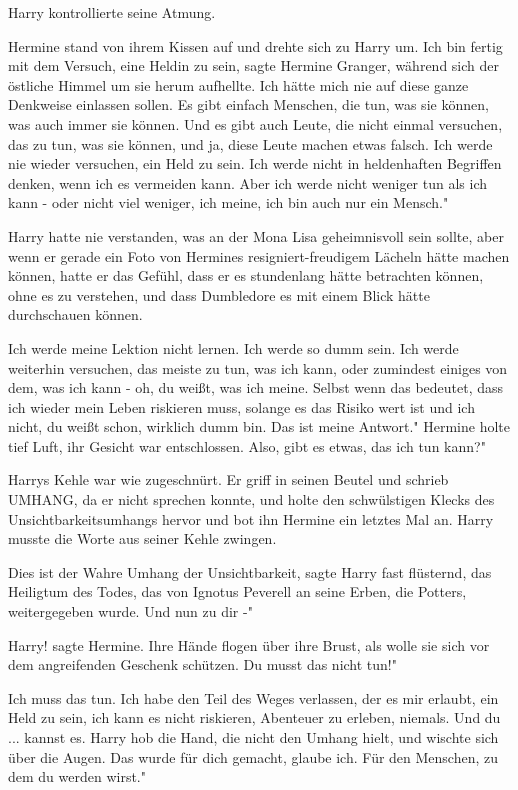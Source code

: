 Harry kontrollierte seine Atmung.

Hermine stand von ihrem Kissen auf und drehte sich zu Harry um. \glqq{}Ich bin
fertig mit dem Versuch, eine Heldin zu sein\grqq{}, sagte Hermine Granger,
während sich der östliche Himmel um sie herum aufhellte. \glqq{}Ich hätte mich
nie auf diese ganze Denkweise einlassen sollen. Es gibt einfach Menschen, die
tun, was sie können, was auch immer sie können. Und es gibt auch Leute, die
nicht einmal versuchen, das zu tun, was sie können, und ja, diese Leute machen
etwas falsch. Ich werde nie wieder versuchen, ein Held zu sein. Ich werde nicht
in heldenhaften Begriffen denken, wenn ich es vermeiden kann. Aber ich werde
nicht weniger tun als ich kann - oder nicht viel weniger, ich meine, ich bin
auch nur ein Mensch."

Harry hatte nie verstanden, was an der Mona Lisa geheimnisvoll sein sollte, aber
wenn er gerade ein Foto von Hermines resigniert-freudigem Lächeln hätte machen
können, hatte er das Gefühl, dass er es stundenlang hätte betrachten können,
ohne es zu verstehen, und dass Dumbledore es mit einem Blick hätte durchschauen
können.

\glqq{}Ich werde meine Lektion nicht lernen. Ich werde so dumm sein. Ich werde
weiterhin versuchen, das meiste zu tun, was ich kann, oder zumindest einiges von
dem, was ich kann - oh, du weißt, was ich meine. Selbst wenn das bedeutet, dass
ich wieder mein Leben riskieren muss, solange es das Risiko wert ist und ich
nicht, du weißt schon, wirklich dumm bin. Das ist meine Antwort." Hermine holte
tief Luft, ihr Gesicht war entschlossen. \glqq{}Also, gibt es etwas, das ich tun
kann?"

Harrys Kehle war wie zugeschnürt. Er griff in seinen Beutel und schrieb UMHANG,
da er nicht sprechen konnte, und holte den schwülstigen Klecks des
Unsichtbarkeitsumhangs hervor und bot ihn Hermine ein letztes Mal an. Harry
musste die Worte aus seiner Kehle zwingen.

\glqq{}Dies ist der Wahre Umhang der Unsichtbarkeit\grqq{}, sagte Harry fast
flüsternd, \glqq{}das Heiligtum des Todes, das von Ignotus Peverell an seine
Erben, die Potters, weitergegeben wurde. Und nun zu dir -"

\glqq{}Harry!\grqq{} sagte Hermine. Ihre Hände flogen über ihre Brust, als wolle
sie sich vor dem angreifenden Geschenk schützen. \glqq{}Du musst das nicht tun!"

\glqq{}Ich muss das tun. Ich habe den Teil des Weges verlassen, der es mir
erlaubt, ein Held zu sein, ich kann es nicht riskieren, Abenteuer zu erleben,
niemals. Und du ... kannst es.\grqq{} Harry hob die Hand, die nicht den Umhang
hielt, und wischte sich über die Augen. \glqq{}Das wurde für dich gemacht, glaube
ich. Für den Menschen, zu dem du werden wirst."

